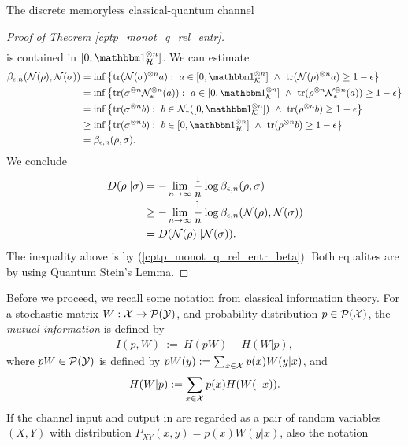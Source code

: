 \begin{section}{The discrete memoryless  classical-quantum channel}
\begin{proof}[Proof of Theorem \ref{cptp_monot_q_rel_entr}]
\begin{align}
		\end{align}
		is contained in $[0, \bbmeins_\cH^{\otimes n}]$. We can estimate 
		\begin{align}
		\beta_{\epsilon, n}(\cN(\rho), \cN(\sigma)) 
		&= \inf\left\{\tr(\cN(\sigma)^{\otimes n} a): \ a \in [0,\bbmeins_\cK^{\otimes n}] \ \wedge \ \tr(\cN(\rho)^{\otimes n} a) \geq 1- \epsilon\right\} \nonumber \\
		&= \inf\left\{\tr(\sigma^{\otimes n} \cN^{\otimes n}_\ast(a)): \ a \in [0,\bbmeins_\cK^{\otimes n}] \ \wedge \ \tr(\rho^{\otimes n} \cN^{\otimes n}_\ast(a)) \geq 1 - \epsilon \right\} \nonumber \\
		&= \inf\left\{\tr(\sigma^{\otimes n} b): \ b \in  \cN_\ast([0,\bbmeins_\cK^{\otimes n}]) \ \wedge \ \tr(\rho^{\otimes n} b) \geq 1-\epsilon\right\} \nonumber \\
		&\geq \inf\left\{\tr(\sigma^{\otimes n} b): \ b \in  [0,\bbmeins_\cH^{\otimes n}] \ \wedge \ \tr(\rho^{\otimes n} b) \geq 1-\epsilon \right\} \nonumber \\
		& = \beta_{\epsilon, n}(\rho, \sigma).\label{cptp_monot_q_rel_entr_beta}
		\end{align}
		We conclude
		\begin{align*}
		D(\rho||\sigma) 
		& = - \lim_{n \rightarrow \infty} \frac{1}{n} \log \beta_{\epsilon,n}(\rho,\sigma) \\
		& \geq - \lim_{n \rightarrow \infty} \frac{1}{n} \log \beta_{\epsilon,n}({\mathcal N}(\rho),{\mathcal N}(\sigma)) \\
		& = D({\mathcal N}(\rho)||{\mathcal N}(\sigma)).
		\end{align*}
		The inequality above is by (\ref{cptp_monot_q_rel_entr_beta}). Both equalites are by using Quantum Stein's Lemma. 
	\end{proof}
	Before we proceed, we recall some notation from classical information theory. For a stochastic matrix $W: {\mathcal X} \rightarrow {\mathcal P}({\mathcal Y})$, and probability distribution $p \in {\mathcal P}({\mathcal X})$, the \emph{mutual information}  is defined by 
	\begin{align*}
	I(p,W) \ := \ H(pW) - H(W|p),
	\end{align*}
	where $pW \in {\mathcal P}({\mathcal Y})$ is defined by $pW(y) := \sum_{x \in {\mathcal X}} p(x)W(y|x)$, and 
	\begin{align*}
	H(W|p) := \sum_{x \in {\mathcal X} } p(x) H(W(\cdot|x)).
	\end{align*}
	If the channel input and output in are regarded as a pair of random variables $(X,Y)$ with 
	distribution $P_{XY}(x,y) = p(x)W(y|x)$, also the notation 

\end{section}
